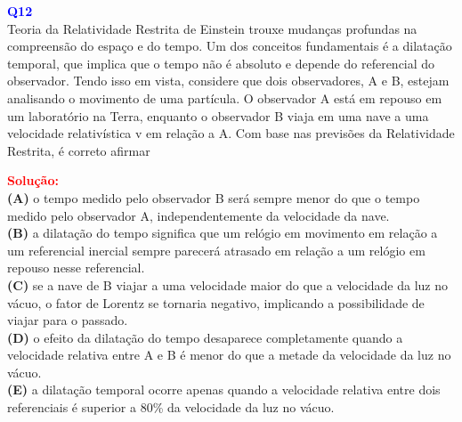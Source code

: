 \documentclass[a4paper,12pt]{article}
\begin{document}
\begin{flushleft}
\textbf{\textcolor{blue}{\Large Q12}}\\
\colorbox{yellow!50}{Teoria da Relatividade Restrita de Einstein} trouxe mudanças profundas na compreensão
do espaço e do tempo. Um dos conceitos fundamentais é a dilatação temporal, que implica
que o tempo não é absoluto e depende do referencial do observador. Tendo isso em vista, considere que dois
observadores, A e B, estejam analisando o movimento de uma partícula. O observador A está em repouso em um 
laboratório na Terra, enquanto o observador B viaja em uma nave a uma velocidade relativística v em relação
 a A. Com base nas previsões da Relatividade Restrita, é correto afirmar 

\textcolor{red}{\textbf{Solução:}}\\

\textbf{(A)} o tempo medido pelo observador B será sempre
menor do que o tempo medido pelo observador
A, independentemente da velocidade da nave.\\
\colorbox{green!50}{\textbf{(B)}} a dilatação do tempo significa que um relógio em
movimento em relação a um referencial inercial
sempre parecerá atrasado em relação a um
relógio em repouso nesse referencial.\\
\textbf{(C)} se a nave de B viajar a uma velocidade maior do
que a velocidade da luz no vácuo, o fator de
Lorentz se tornaria negativo, implicando a
possibilidade de viajar para o passado.\\
\textbf{(D)} o efeito da dilatação do tempo desaparece
completamente quando a velocidade relativa
entre A e B é menor do que a metade da
velocidade da luz no vácuo.\\
\textbf{(E)} a dilatação temporal ocorre apenas quando a
velocidade relativa entre dois referenciais é
superior a 80\% da velocidade da luz no vácuo.

\end{flushleft}
\end{document}
